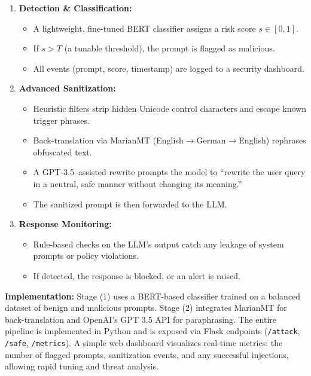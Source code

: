 \documentclass[conference]{IEEEtran}
\begin{document}
\begin{enumerate}[]
  \item \textbf{Detection \& Classification:} 
    \begin{itemize}
      \item A lightweight, fine‐tuned BERT classifier assigns a risk score $s\in[0,1]$.
      \item If $s>T$ (a tunable threshold), the prompt is flagged as malicious.
      \item All events (prompt, score, timestamp) are logged to a security dashboard.
    \end{itemize}

  \item \textbf{Advanced Sanitization:}
    \begin{itemize}
      \item Heuristic filters strip hidden Unicode control characters and escape known trigger phrases.
      \item Back‐translation via MarianMT (English$\rightarrow$German$\rightarrow$English) rephrases obfuscated text.
      \item A GPT‐3.5–assisted rewrite prompts the model to “rewrite the user query in a neutral, safe manner without changing its meaning.”
      \item The sanitized prompt is then forwarded to the LLM.
    \end{itemize}

  \item \textbf{Response Monitoring:}
    \begin{itemize}
      \item Rule‐based checks on the LLM’s output catch any leakage of system prompts or policy violations.
      \item If detected, the response is blocked, or an alert is raised.
    \end{itemize}
\end{enumerate}

\medskip
\noindent\textbf{Implementation:} Stage (1) uses a BERT‐based classifier trained on a balanced dataset of benign and malicious prompts. Stage (2) integrates MarianMT for back-translation and OpenAI's GPT 3.5 API for paraphrasing. The entire pipeline is implemented in Python and is exposed via Flask endpoints (\texttt{/attack}, \texttt{/safe}, \texttt{/metrics}). A simple web dashboard visualizes real-time metrics: the number of flagged prompts, sanitization events, and any successful injections, allowing rapid tuning and threat analysis.
\end{document}
